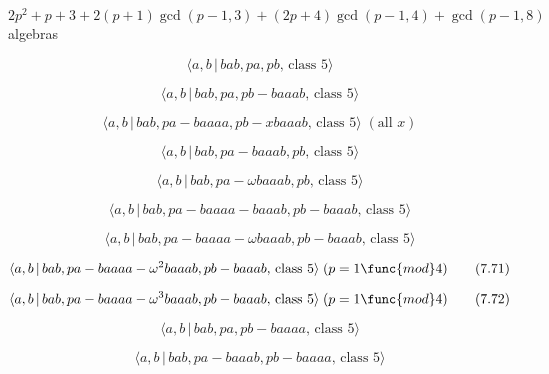 \documentclass[10pt]{article}
\begin{document}
$2p^{2}+p+3+2(p+1)\gcd (p-1,3)+(2p+4)\gcd (p-1,4)+\gcd (p-1,8)$ algebras

\begin{equation}
\langle a,b\,|\,bab,pa,pb,\,\text{class }5\rangle  \tag{7.64}
\end{equation}

\begin{equation}
\langle a,b\,|\,bab,pa,pb-baaab,\,\text{class }5\rangle  \tag{7.65}
\end{equation}

\begin{equation}
\langle a,b\,|\,bab,pa-baaaa,pb-xbaaab,\,\text{class }5\rangle \;(\text{all }%
x)  \tag{7.66}
\end{equation}

\begin{equation}
\langle a,b\,|\,bab,pa-baaab,pb,\,\text{class }5\rangle  \tag{7.67}
\end{equation}

\begin{equation}
\langle a,b\,|\,bab,pa-\omega baaab,pb,\,\text{class }5\rangle  \tag{7.68}
\end{equation}

\begin{equation}
\langle a,b\,|\,bab,pa-baaaa-baaab,pb-baaab,\,\text{class }5\rangle 
\tag{7.69}
\end{equation}

\begin{equation}
\langle a,b\,|\,bab,pa-baaaa-\omega baaab,pb-baaab,\,\text{class }5\rangle 
\tag{7.70}
\end{equation}

\begin{equation}
\langle a,b\,|\,bab,pa-baaaa-\omega ^{2}baaab,pb-baaab,\,\text{class }%
5\rangle \;(p=1\func{mod}4)  \tag{7.71}
\end{equation}

\begin{equation}
\langle a,b\,|\,bab,pa-baaaa-\omega ^{3}baaab,pb-baaab,\,\text{class }%
5\rangle \;(p=1\func{mod}4)  \tag{7.72}
\end{equation}

\begin{equation}
\langle a,b\,|\,bab,pa,pb-baaaa,\,\text{class }5\rangle  \tag{7.73}
\end{equation}

\begin{equation}
\langle a,b\,|\,bab,pa-baaab,pb-baaaa,\,\text{class }5\rangle  \tag{7.74}
\end{equation}
\end{document}
